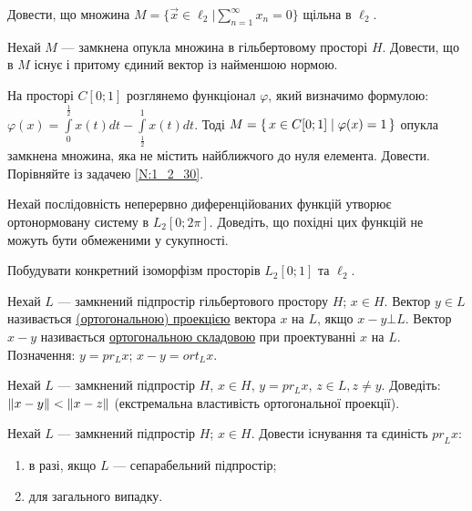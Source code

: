 
\begin{exercise}
    Довести, що множина $M = \{ \vec{x} \in \ell_2 | \sum\limits_{n = 1}^{\infty}x_n = 0\}$
    щільна в $\ell_2$.
\end{exercise}

\begin{exercise}\label{N:1_2_30}
    Нехай $M$ --- замкнена опукла множина в гільбертовому просторі $H$. Довести, що в $M$
    існує і притому єдиний вектор із найменшою нормою.
\end{exercise}

\begin{exercise}
    На просторі $C[0;1]$ розглянемо функціонал $\varphi$, який визначимо формулою: 
    $\varphi(x) = \int\limits_{0}^{\frac{1}{2}}x(t)dt - \int\limits_{\frac{1}{2}}^{1}x(t)dt$. Тоді
    $M = \set{x \in C[0; 1] \mid \varphi(x) = 1}$ опукла замкнена множина, яка не містить найближчого до 
    нуля елемента. Довести. Порівняйте із задачею \ref{N:1_2_30}.
\end{exercise}

\begin{exercise}
    Нехай послідовність неперервно диференційованих функцій утворює ортонормовану систему
    в $L_2[0; 2\pi]$. Доведіть, що похідні цих функцій не можуть бути обмеженими у сукупності.
\end{exercise}

\begin{exercise}
    Побудувати конкретний ізоморфізм просторів $L_2[0;1]$ та $\ell_2$.
\end{exercise}

\begin{theory}
    Нехай $L$ --- замкнений підпростір гільбертового простору $H$; $x \in H$. Вектор
    $y \in L$ називається \uline{(ортогональною) проекцією} вектора $x$ на $L$, якщо
    $x - y \bot L$. Вектор $x - y$ називається \uline{ортогональною складовою} при
    проектуванні $x$ на $L$. Позначення: $y = pr_L x$; $x - y = ort_L x$.
\end{theory}

\begin{exercise}
    Нехай $L$ --- замкнений підпростір $H$, $x \in H$, $y = pr_L x$, $z \in L, z \neq y$.
    Доведіть: $\left\lVert x - y\right\rVert < \left\lVert x - z\right\rVert$ (екстремальна властивість ортогональної проекції).
\end{exercise}

\begin{exercise}
    Нехай $L$ --- замкнений підпростір $H$; $x \in H$. Довести існування та єдиність ${pr}_L x$:
    \begin{enumerate}[label=\ukr*)]
        \item в разі, якщо $L$ --- сепарабельний підпростір;
        \item для загального випадку.
    \end{enumerate}
\end{exercise}

